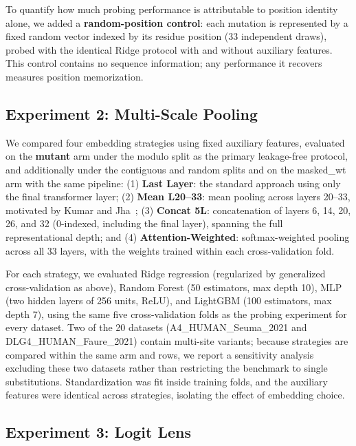 \documentclass[numbered,webpdf,modern,large]{oup-authoring-template}
\newcommand{\rone}[1]{#1}
\newcommand{\rtwo}[1]{#1}
\newcommand{\rthree}[1]{#1}
\begin{document}
\rone{To quantify how much probing performance is attributable to position identity
alone, we added a \textbf{random-position control}: each mutation is represented by a
fixed random vector indexed by its residue position (33 independent draws), probed with
the identical Ridge protocol with and without auxiliary features. This control contains
no sequence information; any performance it recovers measures position memorization.}

\subsection{Experiment 2: Multi-Scale Pooling}

\rone{We compared four embedding strategies using fixed auxiliary features,
evaluated on the \textbf{mutant} arm under the modulo split as the primary
leakage-free protocol\rthree{, and additionally under the contiguous and random splits
and on the masked\_wt arm with the same pipeline}: (1) \textbf{Last Layer}: the standard approach using only the
final transformer layer;
(2) \textbf{Mean L20--33}: mean pooling across layers 20--33, motivated by
Kumar and Jha~\cite{kumar2025};
(3) \textbf{Concat 5L}: concatenation of layers 6, 14, 20, 26, and 32 (0-indexed,
including the final layer), spanning the full representational depth; and
(4) \textbf{Attention-Weighted}: softmax-weighted pooling across all 33 layers, with
the weights trained within each cross-validation fold.}

\rone{For each strategy, we evaluated Ridge regression (regularized by generalized
cross-validation as above), Random Forest (50 estimators,
max depth 10), MLP (two hidden layers of 256 units, ReLU), and LightGBM (100 estimators,
max depth 7)\rtwo{, using the same five cross-validation folds as the probing
experiment for every dataset}. \rthree{Two of the 20 datasets (A4\_HUMAN\_Seuma\_2021
and DLG4\_HUMAN\_Faure\_2021) contain multi-site variants; because strategies are
compared within the same arm and rows, we report a sensitivity analysis excluding
these two datasets rather than restricting the benchmark to single substitutions.} Standardization was fit inside training folds, and the auxiliary
features were identical across strategies, isolating the effect of embedding choice.}

\subsection{Experiment 3: Logit Lens}
\end{document}
